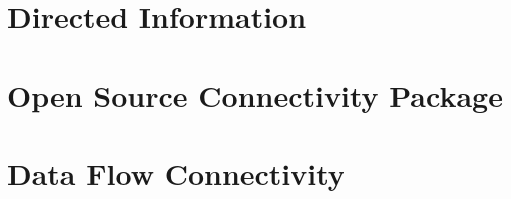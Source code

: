 \section{Directed Information}

\section{Open Source Connectivity Package}

\section{Data Flow Connectivity}